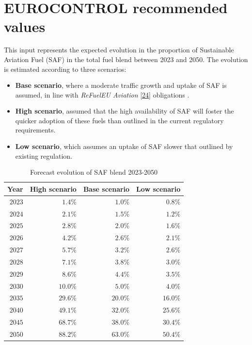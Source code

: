 \documentclass[
  11pt,
  a4paper,
]{book}
\begin{document}
\hypertarget{eurocontrol-recommended-values-6}{%
\section{EUROCONTROL recommended
values}\label{eurocontrol-recommended-values-6}}

This input represents the expected evolution in the proportion of
Sustainable Aviation Fuel (SAF) in the total fuel blend between 2023 and
2050. The evolution is estimated according to three scenarios:

\begin{itemize}
\item
  \textbf{Base scenario}, where a moderate traffic growth and uptake of
  SAF is assumed, in line with \emph{ReFuelEU Aviation}
  \protect\hyperlink{ref-easa:Fit55ReFuelEU}{{[}24{]}} obligations .
\item
  \textbf{High scenario}, assumed that the high availability of SAF will
  foster the quicker adoption of these fuels than outlined in the
  current regulatory requirements.
\item
  \textbf{Low scenario}, which assumes an uptake of SAF slower that
  outlined by existing regulation.
\end{itemize}

\hypertarget{tbl-saf-blend}{}
\begin{longtable}{rrrr}
\caption{\label{tbl-saf-blend}Forecast evolution of SAF blend 2023-2050 }\tabularnewline

\toprule
Year & High scenario & Base scenario & Low scenario \\ 
\midrule
$2023$ & $1.4\%$ & $1.0\%$ & $0.8\%$ \\ 
$2024$ & $2.1\%$ & $1.5\%$ & $1.2\%$ \\ 
$2025$ & $2.8\%$ & $2.0\%$ & $1.6\%$ \\ 
$2026$ & $4.2\%$ & $2.6\%$ & $2.1\%$ \\ 
$2027$ & $5.7\%$ & $3.2\%$ & $2.6\%$ \\ 
$2028$ & $7.1\%$ & $3.8\%$ & $3.0\%$ \\ 
$2029$ & $8.6\%$ & $4.4\%$ & $3.5\%$ \\ 
$2030$ & $10.0\%$ & $5.0\%$ & $4.0\%$ \\ 
$2035$ & $29.6\%$ & $20.0\%$ & $16.0\%$ \\ 
$2040$ & $49.1\%$ & $32.0\%$ & $25.6\%$ \\ 
$2045$ & $68.7\%$ & $38.0\%$ & $30.4\%$ \\ 
$2050$ & $88.2\%$ & $63.0\%$ & $50.4\%$ \\ 
\bottomrule
\end{longtable}
\end{document}
